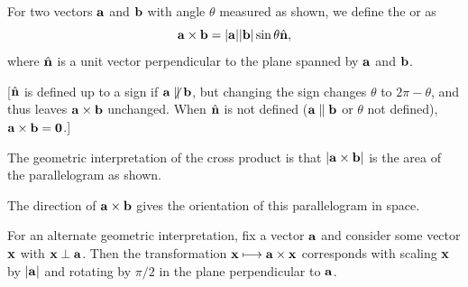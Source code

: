 \documentclass[a4paper]{scrartcl}
\begin{document}
  \begin{definition}
For two vectors $\mathbf{a}$ and $\mathbf{b}$ with angle  $\theta$ measured as shown, we define the  or  as
$$
\mathbf{a} \times \mathbf{b} = | \mathbf{a}| |\mathbf{b}| \sin \theta \hat{\mathbf{n}},
$$
where $\hat{\mathbf{n}}$ is a unit vector perpendicular to the plane spanned by $\mathbf{a}$ and $\mathbf{b}$.

[$\hat{\mathbf{n}}$ is defined up to a sign if $\mathbf{a} \not \parallel \mathbf{b}$, but changing the sign changes $\theta$ to $2\pi - \theta$, and thus leaves $\mathbf{a} \times \mathbf{b}$ unchanged. When $\hat{\mathbf{n}}$ is not defined ($\mathbf{a} \parallel \mathbf{b}$ or $\theta$ not defined), $\mathbf{a} \times \mathbf{b} = \mathbf{0}$.] 
  \end{definition}

  The geometric interpretation of the cross product is that $|\mathbf{a} \times \mathbf{b}|$ is the area of the parallelogram as shown.

  \begin{center}
  \end{center}

  The direction of $\mathbf{a} \times \mathbf{b}$ gives the orientation of this parallelogram in space.   

For an alternate geometric interpretation, fix a vector $\mathbf{a}$ and consider some vector $\mathbf{x}$ with $\mathbf{x} \perp \mathbf{a}$. Then the transformation $\mathbf{x} \longmapsto \mathbf{a} \times \mathbf{x}$ corresponds with scaling $\mathbf{x}$ by $|\mathbf{a}|$ and rotating by $\pi/2$ in the plane perpendicular to $\mathbf{a}$.
\end{document}
